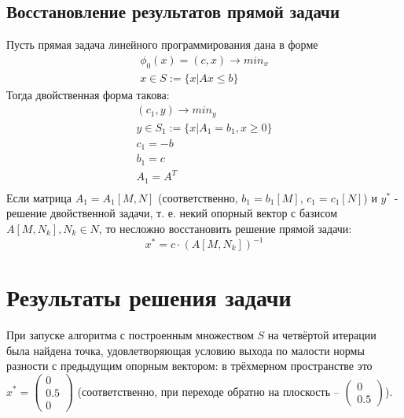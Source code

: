 \documentclass[main.tex]{subfiles}
\begin{document}
\subsection{Восстановление результатов прямой задачи} \label{section:restore}
Пусть прямая задача линейного программирования дана в форме
\begin{gather*}
\phi_0(x) = (c, x) \rightarrow min_{x} \\
x \in S := \{x|Ax \le b\} 
\end{gather*}
Тогда двойственная форма такова:
\begin{gather*}
(c_1, y) \rightarrow min_{y} \\
y \in S_1 := \{x|A_1 = b_1, x \ge 0\}\\
c_1 = -b\\
b_1 = c\\
A_1 = A^T\\
\end{gather*}
Если матрица $A_1=A_1[M,N]$ (соответственно, $b_1 = b_1[M]$, $c_1 = c_1[N]$) и $y^*$ - решение двойственной задачи, т. е. некий опорный вектор с базисом $A[M, N_k], N_k \in N$, то несложно восстановить решение прямой задачи:\\
$$ x^* = c \cdot (A[M, N_k])^{-1}$$
\section{Результаты решения задачи}
При запуске алгоритма с построенным множеством $S$ на четвёртой итерации была найдена точка, удовлетворяющая условию выхода по малости нормы разности с предыдущим опорным вектором: в трёхмерном пространстве это $x^* = \begin{pmatrix}0\\0.5 \\ 0\end{pmatrix}$ (соответственно, при переходе обратно на плоскость -- $\begin{pmatrix}0\\0.5 \end{pmatrix}$). \\
\end{document}
